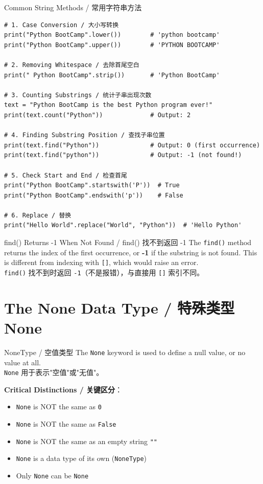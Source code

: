 \documentclass[11pt,a4paper]{report}
\let\oldtexttt\texttt
\renewcommand{\texttt}[1]{\textcolor{mainblue}{\oldtexttt{#1}}}
\begin{document}
\begin{examplebox}{Common String Methods / 常用字符串方法}
\begin{lstlisting}
# 1. Case Conversion / 大小写转换
print("Python BootCamp".lower())        # 'python bootcamp'
print("Python BootCamp".upper())        # 'PYTHON BOOTCAMP'

# 2. Removing Whitespace / 去除首尾空白
print(" Python BootCamp".strip())       # 'Python BootCamp'

# 3. Counting Substrings / 统计子串出现次数
text = "Python BootCamp is the best Python program ever!"
print(text.count("Python"))             # Output: 2

# 4. Finding Substring Position / 查找子串位置
print(text.find("Python"))              # Output: 0 (first occurrence)
print(text.find("python"))              # Output: -1 (not found!)

# 5. Check Start and End / 检查首尾
print("Python BootCamp".startswith('P'))  # True
print("Python BootCamp".endswith('p'))    # False

# 6. Replace / 替换
print("Hello World".replace("World", "Python"))  # 'Hello Python'
\end{lstlisting}
\end{examplebox}

\begin{warning}{find() Returns -1 When Not Found / find() 找不到返回 -1}
    The \texttt{find()} method returns the index of the first occurrence, or \textbf{-1} if the substring is not found. This is different from indexing with \texttt{[]}, which would raise an error. \\
    \texttt{find()} 找不到时返回 \texttt{-1}（不是报错），与直接用 \texttt{[]} 索引不同。
\end{warning}

\section{The None Data Type / 特殊类型 None}

\begin{concept}{NoneType / 空值类型}
    The \texttt{None} keyword is used to define a null value, or no value at all. \\
    \texttt{None} 用于表示"空值"或"无值"。

    \textbf{Critical Distinctions / 关键区分}：
    \begin{itemize}
        \item \texttt{None} is NOT the same as \texttt{0}
        \item \texttt{None} is NOT the same as \texttt{False}
        \item \texttt{None} is NOT the same as an empty string \texttt{""}
        \item \texttt{None} is a data type of its own (\texttt{NoneType})
        \item Only \texttt{None} can be \texttt{None}
    \end{itemize}
\end{concept}
\end{document}
